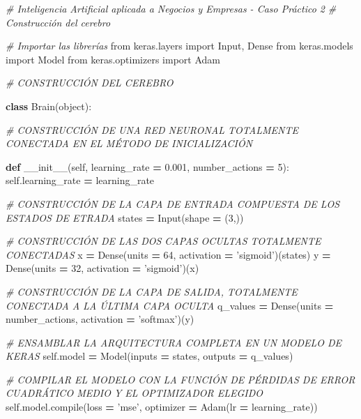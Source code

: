 \documentclass[]{book}
\newenvironment{Shaded}{\begin{snugshade}}{\end{snugshade}}
\newcommand{\BuiltInTok}[1]{#1}
\newcommand{\CommentTok}[1]{\textcolor[rgb]{0.56,0.35,0.01}{\textit{#1}}}
\newcommand{\DecValTok}[1]{\textcolor[rgb]{0.00,0.00,0.81}{#1}}
\newcommand{\FloatTok}[1]{\textcolor[rgb]{0.00,0.00,0.81}{#1}}
\newcommand{\FunctionTok}[1]{\textcolor[rgb]{0.00,0.00,0.00}{#1}}
\newcommand{\ImportTok}[1]{#1}
\newcommand{\KeywordTok}[1]{\textcolor[rgb]{0.13,0.29,0.53}{\textbf{#1}}}
\newcommand{\NormalTok}[1]{#1}
\newcommand{\OperatorTok}[1]{\textcolor[rgb]{0.81,0.36,0.00}{\textbf{#1}}}
\newcommand{\StringTok}[1]{\textcolor[rgb]{0.31,0.60,0.02}{#1}}
\newcommand{\VariableTok}[1]{\textcolor[rgb]{0.00,0.00,0.00}{#1}}
\begin{document}
\begin{Shaded}
\begin{Highlighting}[]
\CommentTok{# Inteligencia Artificial aplicada a Negocios y Empresas - Caso Práctico 2}
\CommentTok{# Construcción del cerebro}

\CommentTok{# Importar las librerías}
\ImportTok{from}\NormalTok{ keras.layers }\ImportTok{import}\NormalTok{ Input, Dense}
\ImportTok{from}\NormalTok{ keras.models }\ImportTok{import}\NormalTok{ Model}
\ImportTok{from}\NormalTok{ keras.optimizers }\ImportTok{import}\NormalTok{ Adam}

\CommentTok{# CONSTRUCCIÓN DEL CEREBRO}

\KeywordTok{class}\NormalTok{ Brain(}\BuiltInTok{object}\NormalTok{):}

    \CommentTok{# CONSTRUCCIÓN DE UNA RED NEURONAL TOTALMENTE CONECTADA EN EL MÉTODO DE INICIALIZACIÓN}

    \KeywordTok{def} \FunctionTok{__init__}\NormalTok{(}\VariableTok{self}\NormalTok{, learning_rate }\OperatorTok{=} \FloatTok{0.001}\NormalTok{, number_actions }\OperatorTok{=} \DecValTok{5}\NormalTok{):}
        \VariableTok{self}\NormalTok{.learning_rate }\OperatorTok{=}\NormalTok{ learning_rate}

        \CommentTok{# CONSTRUCCIÓN DE LA CAPA DE ENTRADA COMPUESTA DE LOS ESTADOS DE ETRADA}
\NormalTok{        states }\OperatorTok{=}\NormalTok{ Input(shape }\OperatorTok{=}\NormalTok{ (}\DecValTok{3}\NormalTok{,))}

        \CommentTok{# CONSTRUCCIÓN DE LAS DOS CAPAS OCULTAS TOTALMENTE CONECTADAS}
\NormalTok{        x }\OperatorTok{=}\NormalTok{ Dense(units }\OperatorTok{=} \DecValTok{64}\NormalTok{, activation }\OperatorTok{=} \StringTok{'sigmoid'}\NormalTok{)(states)}
\NormalTok{        y }\OperatorTok{=}\NormalTok{ Dense(units }\OperatorTok{=} \DecValTok{32}\NormalTok{, activation }\OperatorTok{=} \StringTok{'sigmoid'}\NormalTok{)(x)}

        \CommentTok{# CONSTRUCCIÓN DE LA CAPA DE SALIDA, TOTALMENTE CONECTADA A LA ÚLTIMA CAPA OCULTA}
\NormalTok{        q_values }\OperatorTok{=}\NormalTok{ Dense(units }\OperatorTok{=}\NormalTok{ number_actions, activation }\OperatorTok{=} \StringTok{'softmax'}\NormalTok{)(y)}

        \CommentTok{# ENSAMBLAR LA ARQUITECTURA COMPLETA EN UN MODELO DE KERAS}
        \VariableTok{self}\NormalTok{.model }\OperatorTok{=}\NormalTok{ Model(inputs }\OperatorTok{=}\NormalTok{ states, outputs }\OperatorTok{=}\NormalTok{ q_values)}

        \CommentTok{# COMPILAR EL MODELO CON LA FUNCIÓN DE PÉRDIDAS DE ERROR CUADRÁTICO MEDIO Y EL OPTIMIZADOR ELEGIDO}
        \VariableTok{self}\NormalTok{.model.}\BuiltInTok{compile}\NormalTok{(loss }\OperatorTok{=} \StringTok{'mse'}\NormalTok{, optimizer }\OperatorTok{=}\NormalTok{ Adam(lr }\OperatorTok{=}\NormalTok{ learning_rate))}
\end{Highlighting}
\end{Shaded}
\end{document}
